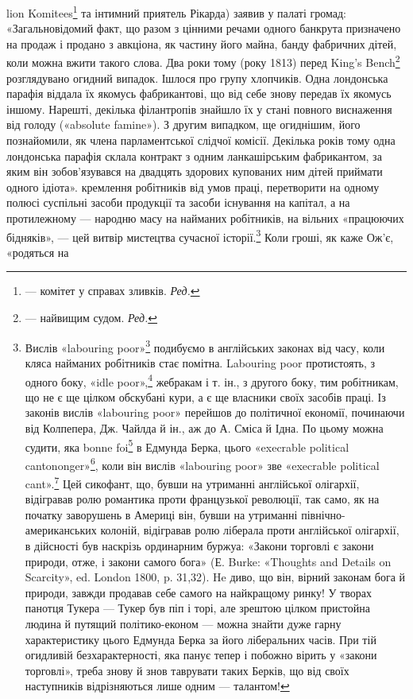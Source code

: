 lion Komitees\footnote*{
— комітет у справах зливків. \emph{Ред.}
} та інтимний приятель Рікарда) заявив у палаті громад:
«Загальновідомий факт, що разом з цінними речами одного банкрута
призначено на продаж і продано з авкціона, як частину його майна, банду
фабричних дітей, коли можна вжити такого слова. Два роки тому (року
1813) перед King’s Bench\footnote*{
— найвищим судом. \emph{Ред.}
} розглядувано огидний випадок. Ішлося про
групу хлопчиків. Одна лондонська парафія віддала їх якомусь фабрикантові,
що від себе знову передав їх якомусь іншому. Нарешті, декілька філантропів
знайшло їх у стані повного виснаження від голоду («absolute
famine»). З другим випадком, ще огиднішим, його познайомили, як члена
парламентської слідчої комісії. Декілька років тому одна лондонська
парафія склала контракт з одним ланкашірським фабрикантом, за яким
він зобов’язувався на двадцять здорових купованих ним дітей приймати
одного ідіота».
кремлення робітників від умов праці, перетворити на одному
полюсі суспільні засоби продукції та засоби існування на капітал,
а на протилежному — народню масу на найманих робітників,
на вільних «працюючих бідняків», — цей витвір мистецтва
сучасної історії.\footnote{
Вислів «labouring poor»\footnote*{
— працюючі бідняки. Peд.
} подибуємо в англійських законах від
часу, коли кляса найманих робітників стає помітна. Labouring poor протистоять,
з одного боку, «idle poor»,\footnote*{
— біднякам-неробам. Peд.
} жебракам і т. ін., з другого боку,
тим робітникам, що не є ще цілком обскубані кури, а є ще власники
своїх засобів праці. Із законів вислів «labouring poor» перейшов
до політичної економії, починаючи від Колпепера, Дж. Чайлда й ін.,
аж до А. Сміса й Ідна. По цьому можна судити, яка bonne foi\footnote*{
— сумлінність. Peд.
} в Едмунда
Берка, цього «execrable political cantononger»\footnote*{
— огидливого політичного крамаря. Peд.
}, коли він вислів
«labouring poor» зве «execrable political cant».\footnote*{
— огидливим політичним перекрученням. \emph{Ред.}
} Цей сикофант, що,
бувши на утриманні англійської олігархії, відігравав ролю романтика проти
французької революції, так само, як на початку заворушень в Америці
він, бувши на утриманні північно-американських колоній, відігравав
ролю ліберала проти англійської олігархії, в дійсності був наскрізь ординарним
буржуа: «Закони торговлі є закони природи, отже, і закони самого
бога» (Е. Burke: «Thoughts and Details on Scarcity», ed. London
1800, p. 31,32). He диво, що він, вірний законам бога й природи, завжди
продавав себе самого на найкращому ринку! У творах панотця Тукера —
Тукер був піп і торі, але зрештою цілком пристойна людина й путящий
політико-економ — можна знайти дуже гарну характеристику цього
Едмунда Берка за його ліберальних часів. При тій огидливій безхарактерності,
яка панує тепер і побожно вірить у «закони торговлі», треба
знову й знов таврувати таких Берків, що від своїх наступників відрізняються
лише одним — талантом!
} Коли гроші, як каже Ож’є, «родяться на
